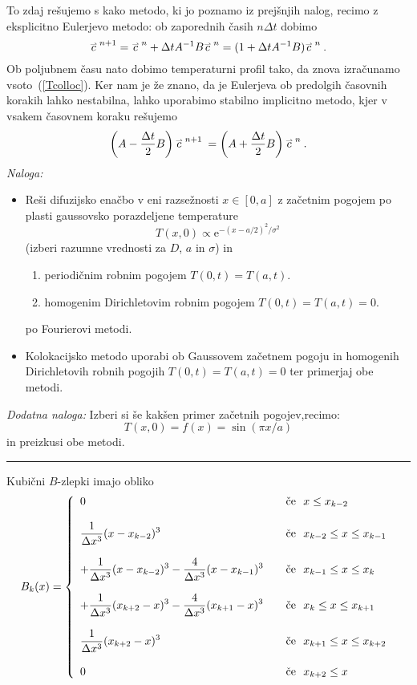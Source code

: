 \documentclass[slovene,11pt,a4paper]{article}
\renewcommand{\vec}[1]{\overset{\smash{\hbox{\raise -0.42ex\hbox{$\scriptscriptstyle\rightharpoonup$}}}}{#1}}
\begin{document}
To zdaj rešujemo s kako metodo, ki jo poznamo iz prejšnjih
nalog, recimo z eksplicitno Eulerjevo metodo: ob zaporednih
časih $n{\Delta t}$ dobimo
$$
\vec{c}^{\>n+1} = \vec{c}^{\>n} + {\Delta t}{ A}^{-1}{ B}\vec{c}^{\>n}
 = ( { 1} + {\Delta t}{ A}^{-1}{ B})\vec{c}^{\>n} \>.
$$
Ob poljubnem času nato dobimo temperaturni profil tako,
da znova izračunamo vsoto~(\ref{Tcolloc}).
Ker nam je že znano, da je Eulerjeva ob predolgih časovnih korakih
lahko nestabilna, lahko uporabimo stabilno implicitno metodo,
kjer v vsakem časovnem koraku rešujemo
$$
  \left( { A} - \frac{\Delta t}{2}{ B}\right)\vec{c}^{\>n+1} \>
 = \left( { A} + \frac{\Delta t}{2}{ B}\right)\vec{c}^{\>n} \>.
$$
\bigskip
{\sl Naloga:}
\begin{itemize}
  \item Reši difuzijsko enačbo v eni razsežnosti $x\in [0,a]$
z začetnim pogojem po plasti gaussovsko porazdeljene temperature
\begin{equation*}
  T(x,0) \propto \mathrm{e}^{-(x-a/2)^2 / \sigma^2}
\end{equation*}
(izberi razumne vrednosti za $D$, $a$ in $\sigma$)
in
\begin{enumerate}
 \item periodičnim robnim pogojem $T(0,t) = T(a,t)$.
 \item homogenim Dirichletovim robnim pogojem $T(0,t) = T(a,t)=0$.
\end{enumerate}
po Fourierovi metodi.
\item Kolokacijsko metodo uporabi ob Gaussovem začetnem pogoju
in homogenih Dirichletovih robnih pogojih $T(0,t)=T(a,t)=0$ ter primerjaj obe metodi.
\end{itemize}
{\sl Dodatna naloga:} Izberi si še kakšen primer začetnih pogojev,recimo:
$$
T(x,0) = f(x) = \sin (\pi x/a)
$$
 in preizkusi obe metodi.
\bigskip\bigskip


\hrule

\bigskip


\bigskip

\noindent Kubični $B$-zlepki imajo obliko
$$
B_k(x) = \left\{
\begin{array}{ll}
  0
    & \quad\text{če~~} x \le x_{k-2} \cr
    & \cr
  \displaystyle\frac{1}{\Delta x^3} (x - x_{k-2})^3
    & \quad\text{če~~} x_{k-2} \le x \le x_{k-1} \cr
    & \cr
 +\displaystyle\frac{1}{\Delta x^3} (x - x_{k-2})^3
 -\displaystyle\frac{4}{\Delta x^3} (x - x_{k-1})^3
    & \quad\text{če~~} x_{k-1} \le x \le x_{k} \cr
    & \cr
    +\displaystyle\frac{1}{\Delta x^3} (x_{k+2} - x)^3
    -\displaystyle\frac{4}{\Delta x^3} (x_{k+1} - x)^3
    & \quad\text{če~~} x_{k} \le x \le x_{k+1} \cr
    & \cr
    \displaystyle\frac{1}{\Delta x^3} (x_{k+2} - x)^3
    & \quad\text{če~~} x_{k+1} \le x \le x_{k+2} \cr
    & \cr
  0
    & \quad\text{če~~} x_{k+2} \le x
\end{array}\right. \>
$$

\end{document}
